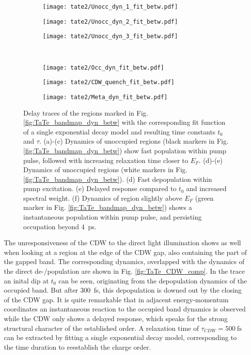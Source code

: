 \begin{figure}[t]
	\centering
	\begin{subfigure}[b]{0.33\textwidth}
		\texttt{[image: tate2/Unocc\_dyn\_1\_fit\_betw.pdf]}
		\caption{}
	\end{subfigure}
	\hfill
	\begin{subfigure}[b]{0.33\textwidth}
		\texttt{[image: tate2/Unocc\_dyn\_2\_fit\_betw.pdf]}
		\caption{}
	\end{subfigure}
	\hfill
	\begin{subfigure}[b]{0.33\textwidth}
		\texttt{[image: tate2/Unocc\_dyn\_3\_fit\_betw.pdf]}
		\caption{}
	\end{subfigure}
	\\
	\begin{subfigure}[b]{0.33\textwidth}
		\texttt{[image: tate2/Occ\_dyn\_fit\_betw.pdf]}
		\caption{}
	\end{subfigure}
	\hfill
	\begin{subfigure}[b]{0.33\textwidth}
		\texttt{[image: tate2/CDW\_quench\_fit\_betw.pdf]}
		\caption{}
	\end{subfigure}
	\hfill
	\begin{subfigure}[b]{0.33\textwidth}
		\texttt{[image: tate2/Meta\_dyn\_fit\_betw.pdf]}
		\caption{}
	\end{subfigure}
	\caption{Delay traces of the regions marked in Fig. \ref{fig:TaTe_bandmap_dyn_betw} with the corresponding fit function of a single exponential decay model and resulting time constants $t_0$ and $\tau$. (a)-(c) Dynamics of unoccupied regions (black markers in Fig. \ref{fig:TaTe_bandmap_dyn_betw}) show fast population within pump pulse, followed with increasing relaxation time closer to $E_F$. (d)-(e) Dynamics of unoccupied regions (white markers in Fig. \ref{fig:TaTe_bandmap_dyn_betw}). (d) Fast depopulation within pump excitation. (e) Delayed response compared to $t_0$ and increased spectral weight. (f) Dynamics of region slightly above $E_F$ (green marker in Fig. \ref{fig:TaTe_bandmap_dyn_betw}) shows a instantaneous population within pump pulse, and persisting occupation beyond \qty{4}{\pico\second}.}
	\label{fig:TaTe_dyn_betw}
\end{figure}

The unresponsiveness of the CDW to the direct light illumination shows as well when looking at a region at the edge of the CDW gap, also containing the part of the gapped band.
The corresponding dynamics, overlapped with the dynamics of the direct de-/population are shown in Fig. \ref{fig:TaTe_CDW_comp}.
In the trace an inital dip at $t_0$ can be seen, originating from the depopulation dynamics of the occupied band.
But after \qty{300}{\femto\second}, this depopulation is downed out by the closing of the CDW gap.
It is quite remarkable that in adjacent energy-momentum coordinates an instantaneous reaction to the occupied band dynamics is observed while the CDW only shows a delayed response, which speaks for the strong structural character of the established order.
A relaxation time of $\tau_{CDW}=\qty{500}{\femto\second}$ can be extracted by fitting a single exponential decay model, corresponding to the time duration to reestablish the charge order.

